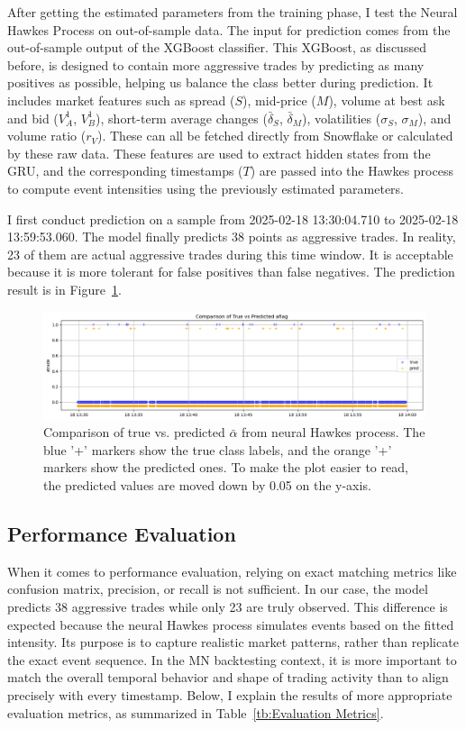 After getting the estimated parameters from the training phase, I test the Neural Hawkes Process on out-of-sample data. The input for prediction comes from the out-of-sample output of the XGBoost classifier. This XGBoost, as discussed before, is designed to contain more aggressive trades by predicting as many positives as possible, helping us balance the class better during prediction. It includes market features such as spread ($S$), mid-price ($M$), volume at best ask and bid ($V_A^1$, $V_B^1$), short-term average changes ($\bar{\delta}_S$, $\bar{\delta}_M$), volatilities ($\sigma_S$, $\sigma_M$), and volume ratio ($r_V$). These can all be fetched directly from Snowflake or calculated by these raw data. These features are used to extract hidden states from the GRU, and the corresponding timestamps ($T$) are passed into the Hawkes process to compute event intensities using the previously estimated parameters.

I first conduct prediction on a sample from 2025-02-18 13:30:04.710 to 2025-02-18 13:59:53.060. The model finally predicts 38 points as aggressive trades. In reality, 23 of them are actual aggressive trades during this time window. It is acceptable because it is more tolerant for false positives than false negatives. The prediction result is in Figure~\ref{fig:nhp-aflag}.

\begin{figure}[H]
    \centering
    \includegraphics[width=0.9\linewidth]{figures/aflag_NHP_181330.png}
    \caption{Comparison of true vs. predicted $\bar{\alpha}$ from neural Hawkes process. 
    The blue '+' markers show the true class labels, and the orange '+' markers show the predicted ones. To make the plot easier to read, the predicted values are moved down by 0.05 on the y-axis.
    }
    \label{fig:nhp-aflag}
\end{figure}



\subsection{Performance Evaluation}
When it comes to performance evaluation, relying on exact matching metrics like confusion matrix, precision, or recall is not sufficient. In our case, the model predicts 38 aggressive trades while only 23 are truly observed. This difference is expected because the neural Hawkes process simulates events based on the fitted intensity. Its purpose is to capture realistic market patterns, rather than replicate the exact event sequence. In the MN backtesting context, it is more important to match the overall temporal behavior and shape of trading activity than to align precisely with every timestamp. Below, I explain the results of more appropriate evaluation metrics, as summarized in Table~\ref{tb:Evaluation Metrics}.

